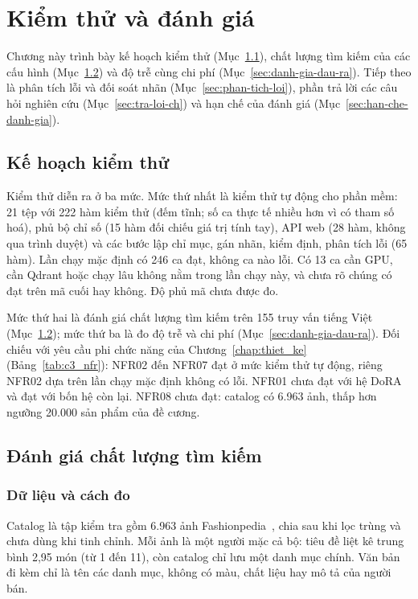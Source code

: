 \chapter{Kiểm thử và đánh giá}
\label{chap:danh_gia}

Chương này trình bày kế hoạch kiểm thử (Mục~\ref{sec:ke-hoach-kiem-thu}), chất lượng tìm kiếm của các cấu hình (Mục~\ref{sec:danh-gia-cot-loi}) và độ trễ cùng chi phí (Mục~\ref{sec:danh-gia-dau-ra}). Tiếp theo là phân tích lỗi và đối soát nhãn (Mục~\ref{sec:phan-tich-loi}), phần trả lời các câu hỏi nghiên cứu (Mục~\ref{sec:tra-loi-ch}) và hạn chế của đánh giá (Mục~\ref{sec:han-che-danh-gia}).

\section{Kế hoạch kiểm thử}
\label{sec:ke-hoach-kiem-thu}

Kiểm thử diễn ra ở ba mức. Mức thứ nhất là kiểm thử tự động cho phần mềm: 21 tệp với 222 hàm kiểm thử (đếm tĩnh; số ca thực tế nhiều hơn vì có tham số hoá), phủ bộ chỉ số (15 hàm đối chiếu giá trị tính tay), API web (28 hàm, không qua trình duyệt) và các bước lập chỉ mục, gán nhãn, kiểm định, phân tích lỗi (65 hàm). Lần chạy mặc định có 246 ca đạt, không ca nào lỗi. Có 13 ca cần GPU, cần Qdrant hoặc chạy lâu không nằm trong lần chạy này, và chưa rõ chúng có đạt trên mã cuối hay không. Độ phủ mã chưa được đo.

Mức thứ hai là đánh giá chất lượng tìm kiếm trên 155 truy vấn tiếng Việt (Mục~\ref{sec:danh-gia-cot-loi}); mức thứ ba là đo độ trễ và chi phí (Mục~\ref{sec:danh-gia-dau-ra}). Đối chiếu với yêu cầu phi chức năng của Chương~\ref{chap:thiet_ke} (Bảng~\ref{tab:c3_nfr}): NFR02 đến NFR07 đạt ở mức kiểm thử tự động, riêng NFR02 dựa trên lần chạy mặc định không có lỗi. NFR01 chưa đạt với hệ DoRA và đạt với bốn hệ còn lại. NFR08 chưa đạt: catalog có 6.963 ảnh, thấp hơn ngưỡng 20.000 sản phẩm của đề cương.

\section{Đánh giá chất lượng tìm kiếm}
\label{sec:danh-gia-cot-loi}

\subsection{Dữ liệu và cách đo}
\label{sec:du-lieu-cach-do}

Catalog là tập kiểm tra gồm 6.963 ảnh Fashionpedia~\cite{jia2020fashionpedia}, chia sau khi lọc trùng và chưa dùng khi tinh chỉnh. Mỗi ảnh là một người mặc cả bộ: tiêu đề liệt kê trung bình 2,95 món (từ 1 đến 11), còn catalog chỉ lưu một danh mục chính. Văn bản đi kèm chỉ là tên các danh mục, không có màu, chất liệu hay mô tả của người bán.

